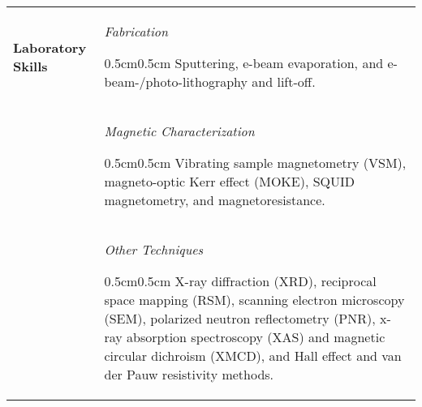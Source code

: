 \documentclass[10pt,letterpaper]{article}
\newcommand{\coll}{1.2}
\newcommand{\colr}{8}
\newcommand{\ind}[1]{
    \begin{adjustwidth}{0.5cm}{0.5cm}
        #1
    \end{adjustwidth}
}
\begin{document}
\vspace{-0.5cm}
\begin{longtabu} to \textwidth{X[\coll] X[\colr]}
    \textbf{Laboratory Skills} & \emph{Fabrication} \newline
    \vspace{-3mm}
    \ind{Sputtering, e-beam evaporation, and e-beam-/photo-lithography and lift-off.} \\
    & \emph{Magnetic Characterization} \newline
    \vspace{-3mm}
    \ind{Vibrating sample magnetometry (VSM), magneto-optic Kerr effect (MOKE), SQUID magnetometry, and magnetoresistance.} \\
    & \emph{Other Techniques} \newline
    \vspace{-3mm}
    \ind{X-ray diffraction (XRD), reciprocal space mapping (RSM), scanning electron microscopy (SEM), polarized neutron reflectometry (PNR), x-ray absorption spectroscopy (XAS) and magnetic circular dichroism (XMCD), and Hall effect and van der Pauw resistivity methods.}
\end{longtabu}
\end{document}
